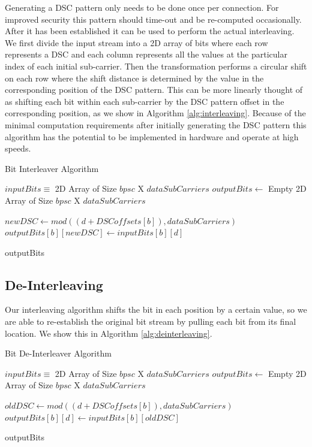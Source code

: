 \documentclass[sigconf, anonymous]{acmart}
\begin{document}
Generating a DSC pattern only needs to be done once per connection. For improved security this pattern should time-out and be re-computed occasionally. After it has been established it can be used to perform the actual interleaving. We first divide the input stream into a 2D array of bits where each row represents a DSC and each column represents all the values at the particular index of each initial sub-carrier. Then the transformation performs a circular shift on each row where the shift distance is determined by the value in the corresponding position of the DSC pattern. This can be more linearly thought of as shifting each bit within each sub-carrier by the DSC pattern offset in the corresponding position, as we show in Algorithm \ref{alg:interleaving}. Because of the minimal computation requirements after initially generating the DSC pattern this algorithm has the potential to be implemented in hardware and operate at high speeds.

\begin{algorithm}[ht]
\caption{Bit Interleaver Algorithm}
\label{alg:interleaving}
\begin{algorithmic}

\REQUIRE $inputBits \equiv$ 2D Array of Size $bpsc$ X $dataSubCarriers$
\STATE $outputBits \leftarrow $ Empty 2D Array of Size $bpsc$ X $dataSubCarriers$
\STATE

        \STATE $newDSC \leftarrow mod((d + DSCoffsets[b]), dataSubCarriers)$
        \STATE $outputBits[b][newDSC] \leftarrow inputBits[b][d]$
    \ENDFOR
\ENDFOR
\STATE

\RETURN outputBits 
\end{algorithmic}
\end{algorithm}



\subsection{De-Interleaving}
\label{sub:deinterleave}

Our interleaving algorithm shifts the bit in each position by a certain value, so we are able to re-establish the original bit stream by pulling each bit from its final location. We show this in Algorithm \ref{alg:deinterleaving}.

\begin{algorithm}[ht]
\caption{Bit De-Interleaver Algorithm}
\label{alg:deinterleaving}
\begin{algorithmic}

\REQUIRE $inputBits \equiv$ 2D Array of Size $bpsc$ X $dataSubCarriers$
\STATE $outputBits \leftarrow $ Empty 2D Array of Size $bpsc$ X $dataSubCarriers$
\STATE

        \STATE $oldDSC \leftarrow mod((d + DSCoffsets[b]), dataSubCarriers)$
        \STATE $outputBits[b][d] \leftarrow inputBits[b][oldDSC]$
    \ENDFOR
\ENDFOR
\STATE

\RETURN outputBits 
\end{algorithmic}
\end{algorithm}
\end{document}
